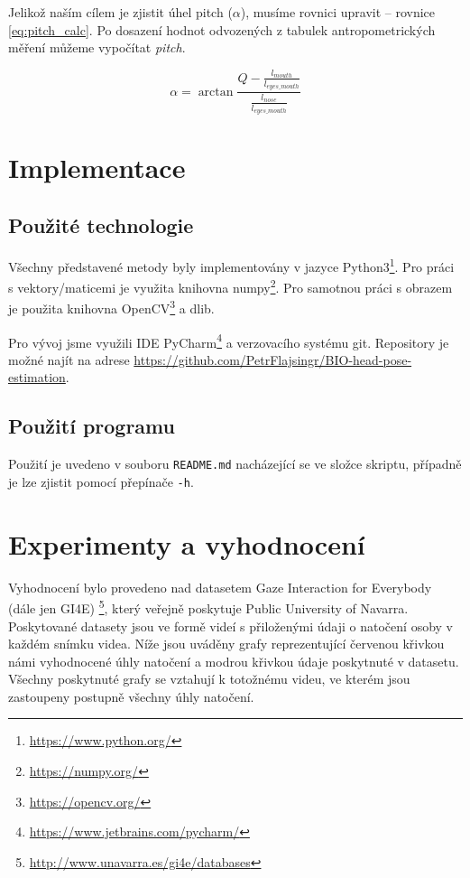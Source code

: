 \documentclass[12pt,a4paper,titlepage,final]{report}
\begin{document}
Jelikož naším cílem je zjistit úhel pitch ($\alpha$), musíme rovnici upravit -- rovnice \ref{eq:pitch_calc}. Po dosazení hodnot odvozených z tabulek antropometrických měření můžeme vypočítat \textit{pitch}.

\begin{equation}\label{eq:pitch_calc}
\alpha = \arctan{\frac{Q - \frac{l_{mouth}}{l_{eyes\_mouth}}}{\frac{l_{nose}}{l_{eyes\_mouth}}}}
\end{equation}

\section{Implementace}
\subsection{Použité technologie}
Všechny představené metody byly implementovány v jazyce Python3\footnote{\url{https://www.python.org/}}. Pro práci s vektory/maticemi je využita knihovna numpy\footnote{\url{https://numpy.org/}}. Pro samotnou práci s obrazem je použita knihovna OpenCV\footnote{\url{https://opencv.org/}} a dlib. 

Pro vývoj jsme využili IDE PyCharm\footnote{\url{https://www.jetbrains.com/pycharm/}} a verzovacího systému git. Repository je možné najít na adrese \url{https://github.com/PetrFlajsingr/BIO-head-pose-estimation}.
\subsection{Použití programu}
Použití je uvedeno v souboru \texttt{README.md} nacházející se ve složce skriptu, případně je lze zjistit pomocí přepínače \texttt{-h}.

\section{Experimenty a vyhodnocení}
Vyhodnocení bylo provedeno nad datasetem Gaze Interaction for Everybody (dále jen GI4E) \footnote{\url{http://www.unavarra.es/gi4e/databases}}, který veřejně poskytuje Public University of Navarra. Poskytované datasety jsou ve formě videí s přiloženými údaji o natočení osoby v každém snímku videa. Níže jsou uváděny grafy reprezentující červenou křivkou námi vyhodnocené úhly natočení a modrou křivkou údaje poskytnuté v datasetu. Všechny poskytnuté grafy se vztahují k totožnému videu, ve kterém jsou zastoupeny postupně všechny úhly natočení.
\end{document}
